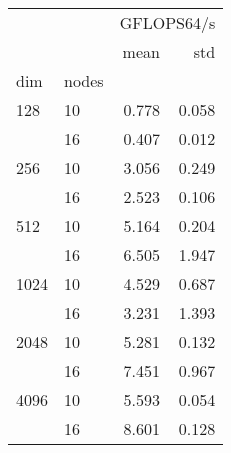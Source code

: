\begin{tabular}{llrr}
\toprule
     &    & \multicolumn{2}{l}{GFLOPS64/s} \\
     &    &       mean &    std \\
dim & nodes &            &        \\
\midrule
128  & 10 &      0.778 &  0.058 \\
     & 16 &      0.407 &  0.012 \\
256  & 10 &      3.056 &  0.249 \\
     & 16 &      2.523 &  0.106 \\
512  & 10 &      5.164 &  0.204 \\
     & 16 &      6.505 &  1.947 \\
1024 & 10 &      4.529 &  0.687 \\
     & 16 &      3.231 &  1.393 \\
2048 & 10 &      5.281 &  0.132 \\
     & 16 &      7.451 &  0.967 \\
4096 & 10 &      5.593 &  0.054 \\
     & 16 &      8.601 &  0.128 \\
\bottomrule
\end{tabular}
